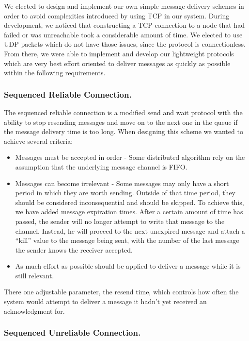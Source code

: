 We elected to design and implement our own simple message delivery schemes in order to avoid complexities introduced by using TCP in our system. During development, we noticed that constructing a TCP connection to a node that had failed or was unreachable took a considerable amount of time. We elected to use UDP packets which do not have those issues, since the protocol is connectionless. From there, we were able to implement and develop our lightweight protocols which are very best effort oriented to deliver messages as quickly as possible within the following requirements.

\subsubsection{Sequenced Reliable Connection.}

The sequenced reliable connection is a modified send and wait protocol with the ability to stop resending messages and move on to the next one in the queue if the message delivery time is too long. When designing this scheme we wanted to achieve several criteria:

\begin{itemize}
\item Messages must be accepted in order - Some distributed algorithm rely on the assumption that the underlying message channel is FIFO.
\item Messages can become irrelevant - Some messages may only have a short period in which they are worth sending. Outside of that time period, they should be considered inconsequential and should be skipped. To achieve this, we have added message expiration times. After a certain amount of time has passed, the sender will no longer attempt to write that message to the channel. Instead, he will proceed to the next unexpired message and attach a ``kill'' value to the message being sent, with the number of the last message the sender knows the receiver accepted.
\item As much effort as possible should be applied to deliver a message while it is still relevant.
\end{itemize}

There one adjustable parameter, the resend time, which controls how often the system would attempt to deliver a message it hadn't yet received an acknowledgment for.

\subsubsection{Sequenced Unreliable Connection.}

